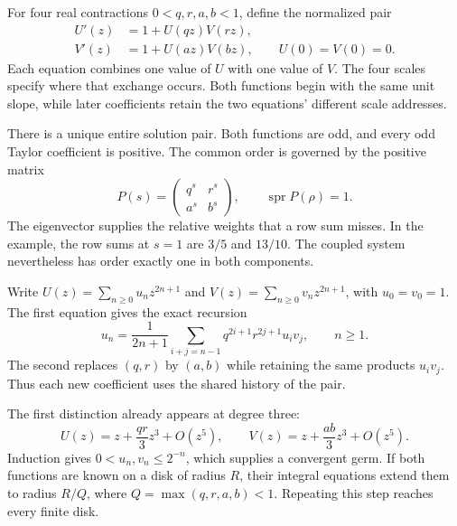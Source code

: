 
For four real contractions $0<q,r,a,b<1$, define the normalized pair
\[
\boxed{\begin{aligned}
U'(z)&=1+U(qz)V(rz),\\
V'(z)&=1+U(az)V(bz),\qquad U(0)=V(0)=0.
\end{aligned}}
\]
Each equation combines one value of $U$ with one value of $V$. The four
scales specify where that exchange occurs. Both functions begin with the
same unit slope, while later coefficients retain the two equations' different
scale addresses.


There is a unique entire solution pair. Both functions are odd, and every
odd Taylor coefficient is positive. The common order is governed by the
positive matrix
\[
P(s)=\begin{pmatrix}q^s&r^s\\a^s&b^s\end{pmatrix},
\qquad \operatorname{spr}P(\rho)=1.
\]
The eigenvector supplies the relative weights that a row sum misses. In
the example, the row sums at $s=1$ are $3/5$ and $13/10$. The coupled
system nevertheless has order exactly one in both components.

Write $U(z)=\sum_{n\ge0}u_nz^{2n+1}$ and
$V(z)=\sum_{n\ge0}v_nz^{2n+1}$, with $u_0=v_0=1$.
The first equation gives the exact recursion
\[
u_n=\frac1{2n+1}\sum_{i+j=n-1}
q^{2i+1}r^{2j+1}u_i v_j,\qquad n\ge1.
\]
The second replaces $(q,r)$ by $(a,b)$ while retaining the same products
$u_i v_j$. Thus each new coefficient uses the shared history of the pair.


The first distinction already appears at degree three:
\[
U(z)=z+\frac{qr}{3}z^3+O(z^5),\qquad
V(z)=z+\frac{ab}{3}z^3+O(z^5).
\]
Induction gives $0<u_n,v_n\le2^{-n}$, which supplies a convergent germ.
If both functions are known on a disk of radius $R$, their integral
equations extend them to radius $R/Q$, where $Q=\max(q,r,a,b)<1$.
Repeating this step reaches every finite disk.

